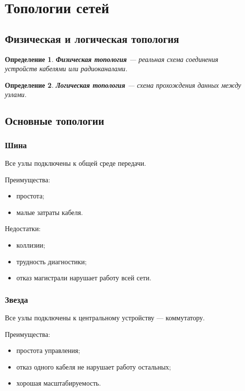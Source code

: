 \documentclass[12pt,a4paper]{article}
\newtheorem{definition}{Определение}
\begin{document}
\section{Топологии сетей}

\subsection{Физическая и логическая топология}

\begin{definition}
\textbf{Физическая топология} --- реальная схема соединения устройств кабелями или радиоканалами.
\end{definition}

\begin{definition}
\textbf{Логическая топология} --- схема прохождения данных между узлами.
\end{definition}

\subsection{Основные топологии}

\subsubsection{Шина}

Все узлы подключены к общей среде передачи.

Преимущества:
\begin{itemize}
    \item простота;
    \item малые затраты кабеля.
\end{itemize}

Недостатки:
\begin{itemize}
    \item коллизии;
    \item трудность диагностики;
    \item отказ магистрали нарушает работу всей сети.
\end{itemize}

\subsubsection{Звезда}

Все узлы подключены к центральному устройству --- коммутатору.

Преимущества:
\begin{itemize}
    \item простота управления;
    \item отказ одного кабеля не нарушает работу остальных;
    \item хорошая масштабируемость.
\end{itemize}
\end{document}
